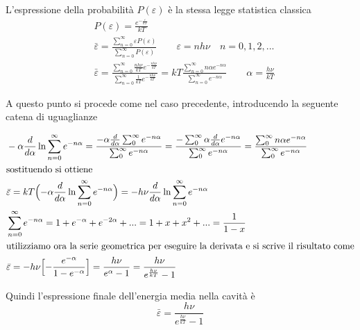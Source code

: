 L'espressione della probabilità $P(\varepsilon)$ è la stessa legge statistica classica
\begin{equation}
\begin{split}
& P(\varepsilon) = \frac{ e^{ -\frac{ \varepsilon}{ kT} }}{kT } \\
& \bar\varepsilon = \frac{ \sum_{n=0}^{\infty} \varepsilon P(\varepsilon)}{\sum_{n=0}^{\infty} P(\varepsilon) } \quad\quad \varepsilon= n h\nu \quad n=0,1,2, ... \\
& \bar\varepsilon = \frac{ \sum_{n=0}^{\infty}  \frac{ nh\nu}{kT } e^{ -\frac{ nh\nu}{kT } }  }{\sum_{n=0}^{\infty} \frac{ 1 }{kT } e^{ -\frac{ nh\nu}{kT } } } =
kT \frac{\sum_{n=0}^{\infty} n\alpha e^{ -n\alpha } }{\sum_{n=0}^{\infty} e^{ -n\alpha } } \quad\quad \alpha = \frac{ h\nu}{kT }
\end{split}
\end{equation}

A questo punto si procede come nel caso precedente, introducendo la seguente catena di uguaglianze

\begin{equation}
\begin{split}
& - \alpha \frac{ d}{d\alpha } \ln \sum_{n=0}^{\infty} e^{-n\alpha} = \frac{ - \alpha \frac{ d}{d\alpha } \sum_{0}^{\infty} e^{-n\alpha} }{ \sum_{0}^{\infty} e^{-n\alpha}} = 
\frac{ - \sum_{0}^{\infty} \alpha \frac{ d}{d\alpha } e^{-n\alpha} }{ \sum_{0}^{\infty} e^{-n\alpha}} = \frac{\sum_{0}^{\infty} n\alpha e^{ -n\alpha } }{\sum_{0}^{\infty} e^{ -n\alpha } } \\
& \mbox{sostituendo si ottiene } \\
& \bar\varepsilon = kT \Bigl(  - \alpha \frac{ d}{d\alpha } \ln \sum_{n=0}^{\infty} e^{ -n\alpha }  \Bigr) = -h\nu \frac{ d}{d\alpha } \ln \sum_{n=0}^{\infty} e^{ -n\alpha } \\
& \sum_{n=0}^{\infty} e^{ -n\alpha } = 1 + e^{ -\alpha } + e^{ -2\alpha } + ... = 1 + x + x^2 + ... = \frac{ 1}{1-x }\\
& \mbox{utilizziamo ora la serie geometrica per eseguire la derivata e si scrive il risultato come} \\
& \bar\varepsilon = - h\nu \Bigl[ - \frac{ e^{ -\alpha }}{1 - e^{ -\alpha } } \Bigr] = \frac{ h\nu}{ e^{ \alpha } - 1 } = \frac{ h\nu}{ e^{ \frac{ h\nu}{kT } } - 1} 
\end{split}
\end{equation}

Quindi l'espressione finale dell'energia media nella cavità è
\begin{equation}
\bar\varepsilon = \frac{ h\nu}{ e^{ \frac{ h\nu}{kT }} - 1} 
\end{equation}

